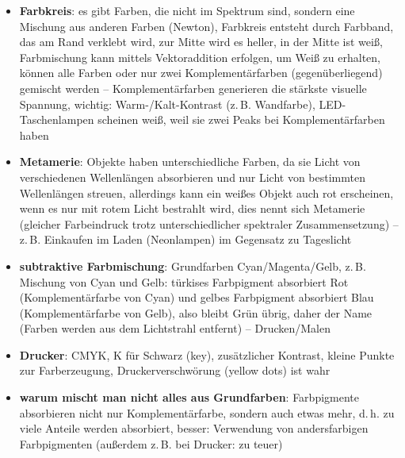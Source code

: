 \begin{itemize}
    \item
    \textbf{Farbkreis}:
    es gibt Farben, die nicht im Spektrum sind, sondern eine Mischung aus
    anderen Farben (Newton),
    Farbkreis entsteht durch Farbband, das am Rand verklebt wird,
    zur Mitte wird es heller, in der Mitte ist weiß,
    Farbmischung kann mittels Vektoraddition erfolgen,
    um Weiß zu erhalten, können alle Farben oder nur zwei Komplementärfarben
    (gegenüberliegend) gemischt werden --
    Komplementärfarben generieren die stärkste visuelle Spannung,
    wichtig: Warm-/Kalt-Kontrast (z.\,B. Wandfarbe),
    LED-Taschenlampen scheinen weiß, weil sie zwei Peaks bei
    Komplementärfarben haben
    
    \item
    \textbf{Metamerie}:
    Objekte haben unterschiedliche Farben, da sie Licht von verschiedenen
    Wellenlängen absorbieren und nur Licht von bestimmten Wellenlängen streuen,
    allerdings kann ein weißes Objekt auch rot erscheinen, wenn es nur
    mit rotem Licht bestrahlt wird, dies nennt sich Metamerie
    (gleicher Farbeindruck trotz unterschiedlicher spektraler
    Zusammensetzung) -- z.\,B. Einkaufen im Laden (Neonlampen) im Gegensatz zu
    Tageslicht
\end{itemize}
\linie
\begin{itemize}
    \item
    \textbf{subtraktive Farbmischung}:
    Grundfarben Cyan/Magenta/Gelb, z.\,B. Mischung von Cyan und Gelb:
    türkises Farbpigment absorbiert Rot (Komplementärfarbe von Cyan) und
    gelbes Farbpigment absorbiert Blau (Komplementärfarbe von Gelb), also
    bleibt Grün übrig, daher der Name
    (Farben werden aus dem Lichtstrahl entfernt) --
    Drucken/Malen
    
    \item
    \textbf{Drucker}: CMYK, K für Schwarz (key), zusätzlicher Kontrast,
    kleine Punkte zur Farberzeugung,
    Druckerverschwörung (yellow dots) ist wahr
    
    \item
    \textbf{warum mischt man nicht alles aus Grundfarben}:
    Farbpigmente absorbieren nicht nur Komplementärfarbe, sondern auch
    etwas mehr, d.\,h. zu viele Anteile werden absorbiert, besser:
    Verwendung von andersfarbigen Farbpigmenten
    (außerdem z.\,B. bei Drucker: zu teuer)
\end{itemize}
\linie
